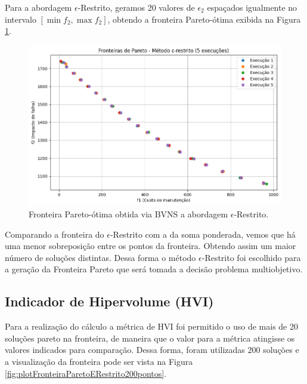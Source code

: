 \documentclass[conference]{IEEEtran}
\begin{document}
Para a abordagem $\epsilon$-Restrito, geramos 20 valores de 
$\epsilon_2$ espaçados igualmente no intervalo $\left[ \min f_2 , \max f_2 \right]$,
obtendo a fronteira Pareto-ótima exibida na Figura \ref{fig:tc2-epsilon}.

\begin{figure}[h!]
	\caption{\label{fig:tc2-epsilon}Fronteira Pareto-ótima obtida via BVNS a 
	abordagem $\epsilon$-Restrito.}
	\begin{center}
    \includegraphics[width=\columnwidth,trim=1 1 1 1,clip]{tc2-epsilon.png}
	\end{center}
\end{figure}

Comparando a fronteira do $\epsilon$-Restrito com a da soma ponderada, vemos 
que há uma menor sobreposição entre os pontos da fronteira. Obtendo assim um maior número de soluções distintas.
Dessa forma o método $\epsilon$-Restrito foi escolhido para a geração da Fronteira Pareto que será tomada a decisão problema multiobjetivo. 

\subsection{Indicador de Hipervolume (HVI)}

Para a realização do cálculo a métrica de HVI foi permitido o uso de mais de 20 soluções pareto na fronteira, de maneira que o valor para a métrica atingisse
os valores indicados para comparação. Dessa forma, foram utilizadas $200$ soluções e a visualização da fronteira pode ser vista na Figura \ref{fig:plotFronteiraParetoERestrito200pontos}.
\end{document}
